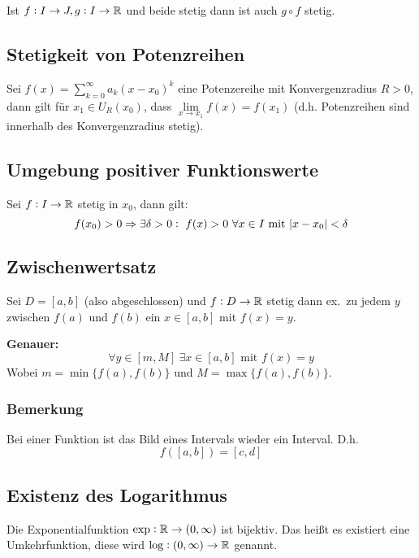 Ist $f: I \rightarrow J, g: I \rightarrow \mathbb{R}$ und beide stetig dann
ist auch $g \circ f$ stetig.

\subsection{Stetigkeit von Potenzreihen}
Sei $f(x) = \sum_{k=0}^\infty a_k {(x - x_0)}^k$ eine Potenzereihe mit
Konvergenzradius $R > 0$, dann gilt für $x_1 \in U_R(x_0)$, dass
$\lim\limits_{x \rightarrow x_1} f(x) = f(x_1)$ (d.h. Potenzreihen
sind innerhalb des Konvergenzradius stetig).

\subsection{Umgebung positiver Funktionswerte}
Sei $f: I \rightarrow \mathbb{R}$ stetig in $x_0$, dann gilt:
\begin{equation*}
    f(x_0) > 0 \Rightarrow \exists \delta > 0:\ f(x)>0\
    \forall x \in I \text{ mit } \abs{x - x_0} < \delta
\end{equation*}

\subsection{Zwischenwertsatz}
Sei $D = [a, b]$ (also abgeschlossen) und $f: D \rightarrow \mathbb{R}$ stetig dann
ex.\ zu jedem $y$ zwischen $f(a)$ und $f(b)$ ein $x \in [a,b]$ mit $f(x) =y$.

\textbf{Genauer:}
\begin{equation*}
    \forall y \in [m, M]\ \exists x \in [a,b] \text{ mit } f(x)=y
\end{equation*}
Wobei $m = \min \{ f(a), f(b) \}$ und $M = \max \{ f(a), f(b) \}$.

\subsubsection{Bemerkung}
Bei einer Funktion ist das Bild eines Intervals wieder ein Interval. D.h.
\begin{equation*}
    f([a,b]) = [c, d]
\end{equation*}

\subsection{Existenz des Logarithmus}
Die Exponentialfunktion $\exp: \mathbb{R} \rightarrow \left( 0, \infty \right)$ ist
bijektiv. Das heißt es existiert eine Umkehrfunktion, diese wird
$\log: \left( 0, \infty \right) \rightarrow \mathbb{R}$ genannt.

